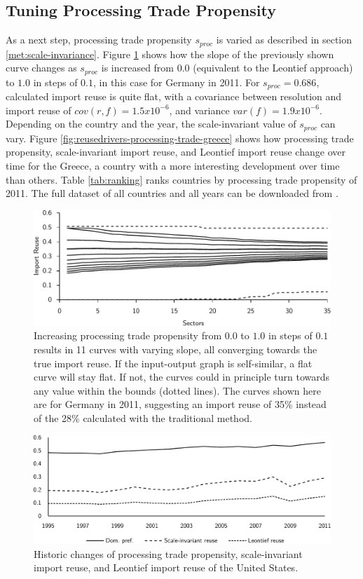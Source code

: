\documentclass[english]{uzhpub}
\begin{document}
\subsection{Tuning Processing Trade Propensity}
As a next step, processing trade propensity $s_{proc}$ is varied as described in section \ref{met:scale-invariance}. Figure \ref{fig:globalpref} shows how the slope of the previously shown curve changes as $s_{proc}$ is increased from $0.0$ (equivalent to the Leontief approach) to $1.0$ in steps of $0.1$, in this case for Germany in 2011. For $s_{proc}=0.686$, calculated import reuse is quite flat, with a covariance between resolution and import reuse of $cov(r, f) = 1.5x10^{-6}$, and variance $var(f)=1.9x10^{-6}$. Depending on the country and the year, the scale-invariant value of $s_{proc}$ can vary. Figure \ref{fig:reusedrivers-processing-trade-greece} shows how processing trade propensity, scale-invariant import reuse, and Leontief import reuse change over time for the Greece, a country with a more interesting development over time than others. Table \ref{tab:ranking} ranks countries by processing trade propensity of 2011. The full dataset of all countries and all years can be downloaded from .

\begin{figure}
\centering
\includegraphics[scale=0.8]{../results/germanrelief2011}
\caption{Increasing processing trade propensity from $0.0$ to $1.0$ in steps of $0.1$ results in 11 curves with varying slope, all converging towards the true import reuse. If the input-output graph is self-similar, a flat curve will stay flat. If not, the curves could in principle turn towards any value within the bounds (dotted lines). The curves shown here are for Germany in 2011, suggesting an import reuse of 35\% instead of the 28\% calculated with the traditional method.} \label{fig:globalpref}
\end{figure}

\begin{figure}
\centering
\includegraphics[scale=0.6]{../results/domprefhistotyusa}
\caption{Historic changes of processing trade propensity, scale-invariant import reuse, and Leontief import reuse of the United States.} \label{fig:domprefhistotyusa}
\end{figure}
\end{document}

